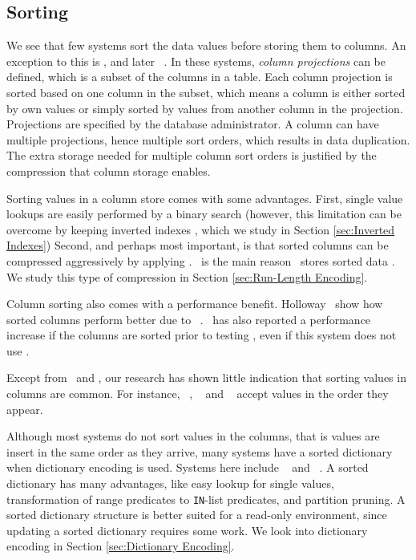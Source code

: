 \subsection{Sorting}
\label{sub:Sorting}
We see that few systems sort the data values before storing them to columns. An exception to this is \cstore, and later \vertica~\cite{Lamb2012-kg, Stonebraker2005-qz}. In these systems, \textit{column projections} can be defined, which is a subset of the columns in a table. Each column projection is sorted based on one column in the subset, which means a column is either sorted by own values or simply sorted by values from another column in the projection. Projections are specified by the database administrator. A column can have multiple projections, hence multiple sort orders, which results in data duplication. The extra storage needed for multiple column sort orders is justified by the compression that column storage enables.


Sorting values in a column store comes with some advantages. First, single value lookups are easily performed by a binary search (however, this limitation can be overcome by keeping inverted indexes \cite{Lemke2010-is, Schwalb2014-hn}, which we study in Section \ref{sec:Inverted Indexes}) Second, and perhaps most important, is that sorted columns can be compressed aggressively by applying \rle. \rle~is the main reason \cstore~stores sorted data \cite{Stonebraker2005-qz}. We study this type of compression in Section \ref{sec:Run-Length Encoding}.

Column sorting also comes with a performance benefit. Holloway \ea~show how sorted columns perform better due to \rle~\cite{Holloway2008-rr}. \blink~has also reported a performance increase if the columns are sorted prior to testing \cite{Johnson2008-cp}, even if this system does not use \rle.

Except from \cstore~and \vertica, our research has shown little indication that sorting values in columns are common. For instance, \mssql~\cite{Larson2013-mc}, \blink~\cite{Raman2013-em} and \oracle~\cite{Lahiri2015-mz} accept values in the order they appear.

Although most systems do not sort values in the columns, that is values are insert in the same order as they arrive, many systems have a sorted dictionary when dictionary encoding is used. Systems here include \blink~\cite{Johnson2008-cp} and \saph~\cite{Farber2012-vh}. A sorted dictionary has many advantages, like easy lookup for single values, transformation of range predicates to \texttt{IN}-list predicates, and partition pruning. A sorted dictionary structure is better suited for a read-only environment, since updating a sorted dictionary requires some work. We look into dictionary encoding in Section \ref{sec:Dictionary Encoding}.

